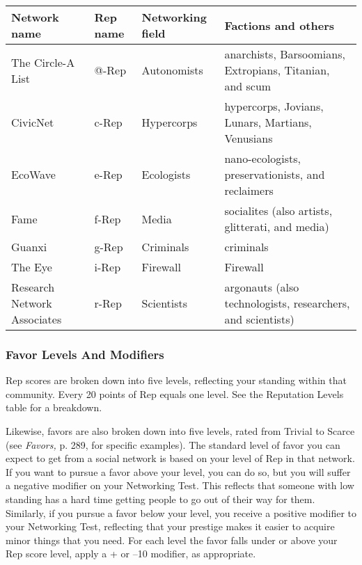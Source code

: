 \begin{table}  \begin{tabularx}{\hline}{|X|l|l|X|} \hline



Network name &Rep name &Networking field &Factions and others \\ \hline

The Circle-A List &@-Rep &Autonomists &anarchists, Barsoomians, Extropians, Titanian, and scum \\ \hline

CivicNet &c-Rep &Hypercorps &hypercorps, Jovians, Lunars, Martians, Venusians \\ \hline

EcoWave &e-Rep &Ecologists &nano-ecologists, preservationists, and reclaimers \\ \hline

Fame &f-Rep &Media &socialites (also artists, glitterati, and media) \\ \hline

Guanxi &g-Rep &Criminals &criminals \\ \hline

The Eye &i-Rep &Firewall &Firewall \\ \hline

Research Network Associates &r-Rep &Scientists &argonauts (also technologists, researchers, and scientists) \\ \hline

\end{tabularx} \end{table} 

\subsubsection{Favor Levels And Modifiers} 

Rep scores are broken down into five levels, reflecting your standing within that community. Every 20 points of Rep equals one level. See the Reputation Levels table for a breakdown. 

Likewise, favors are also broken down into five levels, rated from Trivial to Scarce (see \textit{Favors,} p. 289, for specific examples). The standard level of favor you can expect to get from a social network is based on your level of Rep in that network. If you want to pursue a favor above your level, you can do so, but you will suffer a negative modifier on your Networking Test. This reflects that someone with low standing has a hard time getting people to go out of their way for them. Similarly, if you pursue a favor below your level, you receive a positive modifier to your Networking Test, reflecting that your prestige makes it easier to acquire minor things that you need. For each level the favor falls under or above your Rep score level, apply a + or –10 modifier, as appropriate. 

